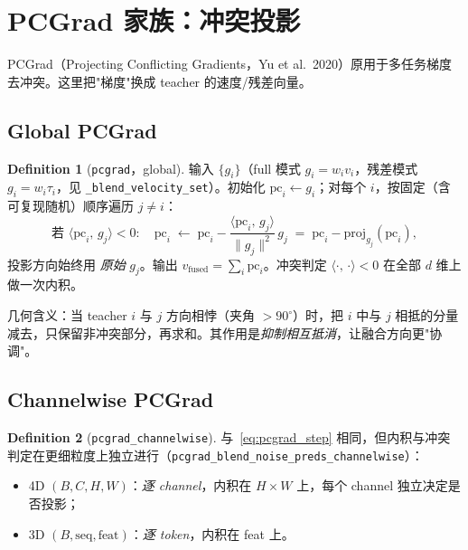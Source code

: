 \documentclass[11pt,a4paper]{article}
\newcommand{\vfused}{v_{\mathrm{fused}}}
\newcommand{\inner}[2]{\langle #1,\, #2\rangle}
\newcommand{\norm}[1]{\lVert #1\rVert}
\newcommand{\proj}[2]{\mathrm{proj}_{#2}\!\left(#1\right)}
\theoremstyle{plain}
\theoremstyle{definition}
\newtheorem{definition}{Definition}
\begin{document}
\section{PCGrad 家族：冲突投影}

PCGrad（Projecting Conflicting Gradients，Yu et al.\ 2020）原用于多任务梯度去冲突。这里把"梯度"换成 teacher 的速度/残差向量。

\subsection{Global PCGrad}

\begin{definition}[\texttt{pcgrad}，global]
\label{def:pcgrad}
输入 $\{g_i\}$（full 模式 $g_i=w_iv_i$，残差模式 $g_i=w_i\tau_i$，见 \texttt{\_blend\_velocity\_set}）。初始化 $\mathrm{pc}_i\gets g_i$；对每个 $i$，按固定（含可复现随机）顺序遍历 $j\neq i$：
\begin{equation}
\text{若 } \inner{\mathrm{pc}_i}{g_j}<0:\quad
\mathrm{pc}_i \;\gets\; \mathrm{pc}_i - \frac{\inner{\mathrm{pc}_i}{g_j}}{\norm{g_j}^2}\,g_j
\;=\; \mathrm{pc}_i - \proj{\mathrm{pc}_i}{g_j},
\label{eq:pcgrad_step}
\end{equation}
投影方向始终用 \emph{原始} $g_j$。输出 $\vfused=\sum_i\mathrm{pc}_i$。冲突判定 $\inner{\cdot}{\cdot}<0$ 在全部 $d$ 维上做一次内积。
\end{definition}

几何含义：当 teacher $i$ 与 $j$ 方向相悖（夹角 $>90^\circ$）时，把 $i$ 中与 $j$ 相抵的分量减去，只保留非冲突部分，再求和。其作用是\emph{抑制相互抵消}，让融合方向更"协调"。

\subsection{Channelwise PCGrad}

\begin{definition}[\texttt{pcgrad\_channelwise}]
\label{def:channelwise}
与~\eqref{eq:pcgrad_step} 相同，但内积与冲突判定在更细粒度上独立进行（\texttt{pcgrad\_blend\_noise\_preds\_channelwise}）：
\begin{itemize}[leftmargin=1.6em]
\item 4D $(B,C,H,W)$：\emph{逐 channel}，内积在 $H\times W$ 上，每个 channel 独立决定是否投影；
\item 3D $(B,\text{seq},\text{feat})$：\emph{逐 token}，内积在 feat 上。
\end{itemize}
\end{definition}
\end{document}
